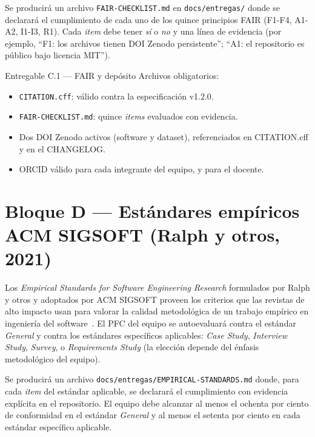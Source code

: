\documentclass[11pt,a4paper]{article}
\begin{document}
Se producir\'a un archivo \texttt{FAIR-CHECKLIST.md} en \texttt{docs/entregas/} donde se declarar\'a el cumplimiento de cada uno de los quince principios FAIR (F1-F4, A1-A2, I1-I3, R1). Cada \emph{item} debe tener \emph{s\'i} o \emph{no} y una l\'inea de evidencia (por ejemplo, ``F1: los archivos tienen DOI Zenodo persistente''; ``A1: el repositorio es p\'ublico bajo licencia MIT'').

\begin{cajaentregable}{Entregable C.1 --- FAIR y dep\'osito}
Archivos obligatorios:
\begin{itemize}
    \item \texttt{CITATION.cff}: v\'alido contra la especificaci\'on v1.2.0.
    \item \texttt{FAIR-CHECKLIST.md}: quince \emph{items} evaluados con evidencia.
    \item Dos DOI Zenodo activos (software y dataset), referenciados en CITATION.cff y en el CHANGELOG.
    \item ORCID v\'alido para cada integrante del equipo, y para el docente.
\end{itemize}
\end{cajaentregable}

\section{Bloque D --- Est\'andares emp\'iricos ACM SIGSOFT (Ralph y otros, 2021)}

Los \emph{Empirical Standards for Software Engineering Research} formulados por Ralph y otros y adoptados por ACM SIGSOFT proveen los criterios que las revistas de alto impacto usan para valorar la calidad metodol\'ogica de un trabajo emp\'irico en ingenier\'ia del software~\cite{ralph2021empirical}. El PFC del equipo se autoevaluar\'a contra el est\'andar \emph{General} y contra los est\'andares espec\'ificos aplicables: \emph{Case Study}, \emph{Interview Study}, \emph{Survey}, o \emph{Requirements Study} (la elecci\'on depende del \'enfasis metodol\'ogico del equipo).

Se producir\'a un archivo \texttt{docs/entregas/EMPIRICAL-STANDARDS.md} donde, para cada \emph{item} del est\'andar aplicable, se declarar\'a el cumplimiento con evidencia expl\'icita en el repositorio. El equipo debe alcanzar al menos el ochenta por ciento de conformidad en el est\'andar \emph{General} y al menos el setenta por ciento en cada est\'andar espec\'ifico aplicable.
\end{document}
